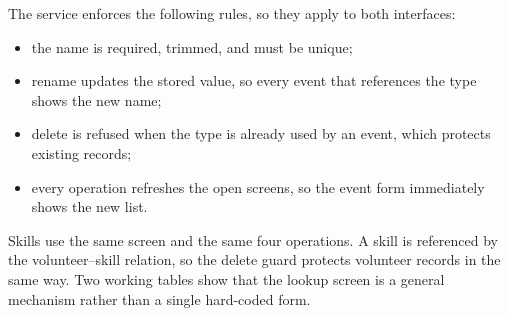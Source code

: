 The service enforces the following rules, so they apply to both interfaces:

\begin{itemize}
  \item the name is required, trimmed, and must be unique;
  \item rename updates the stored value, so every event that references the type shows the new name;
  \item delete is refused when the type is already used by an event, which protects existing records;
  \item every operation refreshes the open screens, so the event form immediately shows the new list.
\end{itemize}

Skills use the same screen and the same four operations. A skill is referenced by the volunteer--skill relation, so the delete guard protects volunteer records in the same way. Two working tables show that the lookup screen is a general mechanism rather than a single hard-coded form.

